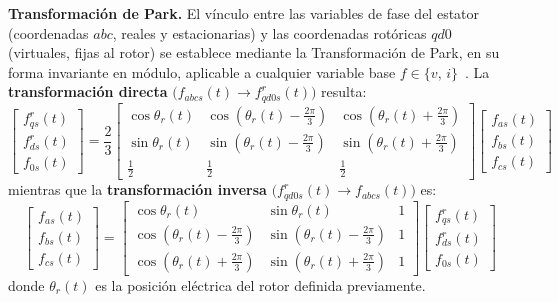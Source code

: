 \documentclass[12pt, a4paper,journal, onecolumn, compsoc]{IEEEtran}
\begin{document}
\textbf{Transformación de Park.} El vínculo entre las variables de fase del estator (coordenadas $abc$, reales y estacionarias) y las coordenadas rotóricas $qd0$ (virtuales, fijas al rotor) se establece mediante la Transformación de Park, en su forma invariante en módulo, aplicable a cualquier variable base $f\in\{v,\,i\}$~\cite{guia_trabajo}. La \textbf{transformación directa} $\big(f_{abcs}(t)\to f_{qd0s}^{r}(t)\big)$ resulta:
\begin{equation}\label{eq:park_directa}
\begin{bmatrix}
f_{qs}^r(t) \\
f_{ds}^r(t) \\
f_{0s}(t)
\end{bmatrix}
= \frac{2}{3}
\begin{bmatrix}
\cos\theta_r(t) & \cos(\theta_r(t)-\frac{2\pi}{3}) & \cos(\theta_r(t)+\frac{2\pi}{3}) \\
\sin\theta_r(t) & \sin(\theta_r(t)-\frac{2\pi}{3}) & \sin(\theta_r(t)+\frac{2\pi}{3}) \\
\frac{1}{2} & \frac{1}{2} & \frac{1}{2}
\end{bmatrix}
\begin{bmatrix}
f_{as}(t) \\
f_{bs}(t) \\
f_{cs}(t)
\end{bmatrix}
\end{equation}
mientras que la \textbf{transformación inversa} $\big(f_{qd0s}^{r}(t)\to f_{abcs}(t)\big)$ es:
\begin{equation}\label{eq:park_inversa}
\begin{bmatrix}
f_{as}(t) \\
f_{bs}(t) \\
f_{cs}(t)
\end{bmatrix}
=
\begin{bmatrix}
\cos\theta_r(t) & \sin\theta_r(t) & 1 \\
\cos(\theta_r(t)-\frac{2\pi}{3}) & \sin(\theta_r(t)-\frac{2\pi}{3}) & 1 \\
\cos(\theta_r(t)+\frac{2\pi}{3}) & \sin(\theta_r(t)+\frac{2\pi}{3}) & 1
\end{bmatrix}
\begin{bmatrix}
f_{qs}^r(t) \\
f_{ds}^r(t) \\
f_{0s}(t)
\end{bmatrix}
\end{equation}
donde $\theta_r(t)$ es la posición eléctrica del rotor definida previamente.
\end{document}
